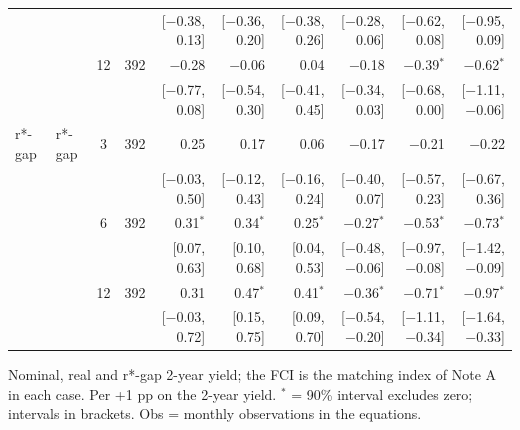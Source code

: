 \begin{table}[p]
\begin{tabular}{llcrrrrrrr}
 & & & & {\scriptsize [$-$0.38, 0.13]} & {\scriptsize [$-$0.36, 0.20]} & {\scriptsize [$-$0.38, 0.26]} & {\scriptsize [$-$0.28, 0.06]} & {\scriptsize [$-$0.62, 0.08]} & {\scriptsize [$-$0.95, 0.09]}\\
 &  & 12 & 392 & $-$0.28 & $-$0.06 & 0.04 & $-$0.18 & $-$0.39$^{*}$ & $-$0.62$^{*}$\\
 & & & & {\scriptsize [$-$0.77, 0.08]} & {\scriptsize [$-$0.54, 0.30]} & {\scriptsize [$-$0.41, 0.45]} & {\scriptsize [$-$0.34, 0.03]} & {\scriptsize [$-$0.68, 0.00]} & {\scriptsize [$-$1.11, $-$0.06]}\\
r*-gap & r*-gap & 3 & 392 & 0.25 & 0.17 & 0.06 & $-$0.17 & $-$0.21 & $-$0.22\\
 & & & & {\scriptsize [$-$0.03, 0.50]} & {\scriptsize [$-$0.12, 0.43]} & {\scriptsize [$-$0.16, 0.24]} & {\scriptsize [$-$0.40, 0.07]} & {\scriptsize [$-$0.57, 0.23]} & {\scriptsize [$-$0.67, 0.36]}\\
 &  & 6 & 392 & 0.31$^{*}$ & 0.34$^{*}$ & 0.25$^{*}$ & $-$0.27$^{*}$ & $-$0.53$^{*}$ & $-$0.73$^{*}$\\
 & & & & {\scriptsize [0.07, 0.63]} & {\scriptsize [0.10, 0.68]} & {\scriptsize [0.04, 0.53]} & {\scriptsize [$-$0.48, $-$0.06]} & {\scriptsize [$-$0.97, $-$0.08]} & {\scriptsize [$-$1.42, $-$0.09]}\\
 &  & 12 & 392 & 0.31 & 0.47$^{*}$ & 0.41$^{*}$ & $-$0.36$^{*}$ & $-$0.71$^{*}$ & $-$0.97$^{*}$\\
 & & & & {\scriptsize [$-$0.03, 0.72]} & {\scriptsize [0.15, 0.75]} & {\scriptsize [0.09, 0.70]} & {\scriptsize [$-$0.54, $-$0.20]} & {\scriptsize [$-$1.11, $-$0.34]} & {\scriptsize [$-$1.64, $-$0.33]}\\
\bottomrule\end{tabular}
\par\smallskip\parbox{0.96\linewidth}{\scriptsize Nominal, real and r*-gap 2-year yield; the FCI is the matching index of Note A in each case. Per +1 pp on the 2-year yield. $^{*}$ = 90\% interval excludes zero; intervals in brackets. Obs = monthly observations in the equations.}
\end{table}
